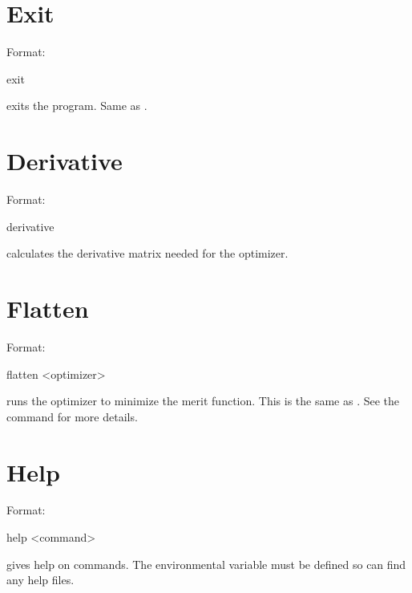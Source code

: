 \section{Exit}
\label{s:exit}

Format:
\begin{example}
  exit
\end{example}

\vskip 0.2in
 exits the program. Same as .

\section{Derivative}
\label{s:deriv}

Format:
\begin{example}
  derivative
\end{example}

\vskip 0.2in 
 calculates the  derivative
matrix needed for the  optimizer.

\section{Flatten}
\label{s:flatten}

Format:
\begin{example}
  flatten <optimizer>
\end{example}

\vskip 0.2in
 runs the optimizer to minimize the merit function. This is the 
same as . See the  command for more details.

\section{Help}
\label{s:help}

Format:
\begin{example}
  help <command>
\end{example}

\vskip 0.2in 
 gives help on \tao commands. The environmental
variable  must be defined so \tao can find any help files.

